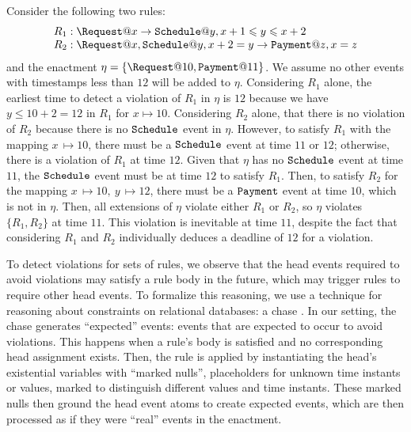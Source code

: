 \begin{examp}\label{example:multiple-rule-chase}
  Consider the following two rules:
  \[
  \begin{array}{l}
    R_1:
    \Request@x \rightarrow
    \Schedule@y, x+1 \leq y \leq x+2
    \\
    R_2:
    \Request@x, \Schedule@y, x+2=y \rightarrow
    \Payment@z, x=z
  \end{array}
  \]
  and the enactment $\eta=\{\Request@10, \Payment@11\}$.
  We assume no other events with timestamps less than $12$
  will be added to $\eta$.
  Considering $R_1$ alone,
  the earliest time to detect a violation
  of $R_1$ in $\eta$ is $12$
  because we have $y \leq 10+2=12$ in $R_1$ for $x\mapsto 10$.
  Considering $R_2$ alone,
  that there is no violation of $R_2$
  because there is no $\texttt{Schedule}$ event in $\eta$.
  However, 
  to satisfy $R_1$ with the mapping $x\,{\mapsto} 10$,
  there must be a $\texttt{Schedule}$ event at time $11$ or $12$;
  otherwise,
  there is a violation of $R_1$ at time $12$.
  Given that $\eta$ has no $\texttt{Schedule}$ event at time $11$,
  the $\texttt{Schedule}$ event must be at time $12$ to satisfy $R_1$.
  Then,
  to satisfy $R_2$ for the mapping $x\,{\mapsto}10,\ y\,{\mapsto} 12$,
  there must be a $\texttt{Payment}$ event at time $10$,
  which is not in $\eta$.
  Then,
  all extensions of $\eta$ violate either $R_1$ or $R_2$,
  so
  $\eta$ violates $\{R_1,R_2\}$ at time $11$.
  This violation is inevitable at time $11$,
  despite the fact that considering $R_1$ and $R_2$ individually
  deduces a deadline of $12$ for a violation.
\end{examp}

To detect violations for sets of rules,
we observe that
the head events required to avoid violations
may satisfy a rule body in the future,
which may trigger rules to require other head events.
To formalize this reasoning,
we use a technique for reasoning about
constraints on relational databases:
a chase \cite{AHV95}.
In our setting, the chase generates ``expected'' events:
events that are expected to occur
to avoid violations.
This happens 
when a rule's body is satisfied
and no corresponding head assignment exists.
Then,
the rule is applied by instantiating the head's existential variables
with ``marked nulls'',
placeholders for unknown time instants or values,
marked to distinguish different values and time instants.
These marked nulls then ground the head event atoms
to create expected events,
which are then processed as if they were ``real'' events
in the enactment.

